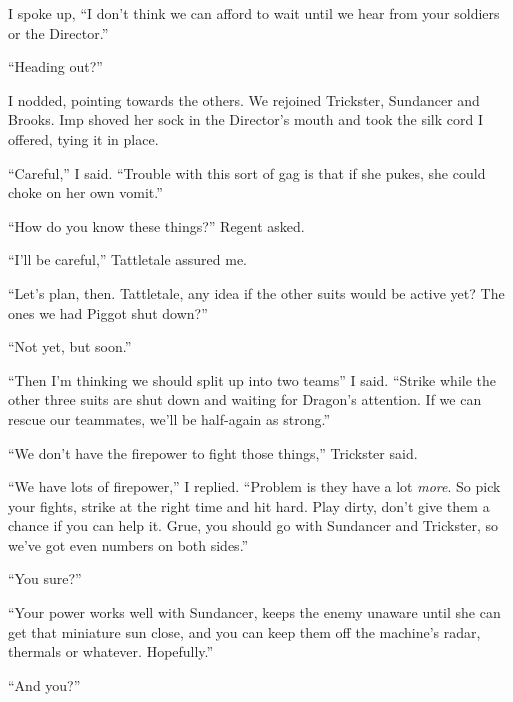 I spoke up, ``I don't think we can afford to wait until we hear from your soldiers or the Director.''



``Heading out?''



I nodded, pointing towards the others.  We rejoined Trickster, Sundancer and Brooks.  Imp shoved her sock in the Director's mouth and took the silk cord I offered, tying it in place.



``Careful,'' I said.  ``Trouble with this sort of gag is that if she pukes, she could choke on her own vomit.''



``How do you know these things?'' Regent asked.



``I'll be careful,'' Tattletale assured me.



``Let's plan, then.  Tattletale, any idea if the other suits would be active yet?  The ones we had Piggot shut down?''



``Not yet, but soon.''



``Then I'm thinking we should split up into two teams'' I said.  ``Strike while the other three suits are shut down and waiting for Dragon's attention.  If we can rescue our teammates, we'll be half-again as strong.''



``We don't have the firepower to fight those things,'' Trickster said.



``We have lots of firepower,'' I replied.  ``Problem is they have a lot \emph{more}.  So pick your fights, strike at the right time and hit hard.  Play dirty, don't give them a chance if you can help it.  Grue, you should go with Sundancer and Trickster, so we've got even numbers on both sides.''



``You sure?''



``Your power works well with Sundancer, keeps the enemy unaware until she can get that miniature sun close, and you can keep them off the machine's radar, thermals or whatever.  Hopefully.''



``And you?''



